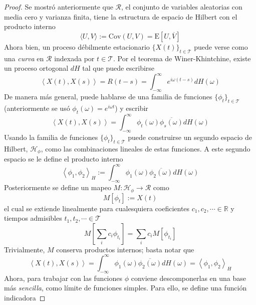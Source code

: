 \documentclass[12pt,letterpaper,draft]{book}
\newcommand{\R}{\mathbb{R}}
\newcommand{\intR}{\int_{-\infty}^{\infty}}
\newcommand{\E}[1]{\mathrm{E}\left[ #1 \right]}
\newcommand{\Cov}[1]{\mathrm{Cov}\left( #1 \right)}
\newcommand{\xt}{$\{X(t)\}_{t\in \mathcal{T}}$ }
\newcommand{\pint}[1]{\left\langle #1 \right\rangle}
\begin{document}
\begin{proof}
Se mostró anteriormente que $\mathcal{R}$, el conjunto de variables aleatorias con media cero y varianza finita, tiene la estructura de espacio de Hilbert con el producto interno
\begin{equation}
\langle U , V \rangle := \Cov{U,V} = \E{U, \overline{V}}
\end{equation}
Ahora bien, un proceso débilmente estacionario \xt puede verse como una \textit{curva} en $\mathcal{R}$ indexada por $t \in \mathcal{T}$.
%
Por el teorema de Winer-Khintchine, existe un proceso ortogonal $dH$ tal que puede escribirse
\begin{equation}
\pint{X(t),X(s)} = R(t-s) = \intR e^{i \omega (t-s)} dH(\omega)
\end{equation} 
De manera más general, puede hablarse de una familia de funciones $\{ \phi_t \}_{t\in \mathcal{T}}$ (anteriormente se usó $\phi_t(\omega) = e^{i \omega t}$) y escribir
\begin{equation}
\pint{X(t),X(s)} = \intR \phi_t(\omega) \overline{\phi_s(\omega)} dH(\omega)
\end{equation} 
Usando la familia de funciones $\{ \phi_t \}_{t\in \mathcal{T}}$ puede construirse un segundo espacio de Hilbert, $\mathcal{H}_\phi$, como las combinaciones lineales de estas funciones.
A este segundo espacio se le define el producto interno
\begin{equation}
\pint{\phi_1,\phi_2}_H := \intR \phi_1(\omega) \overline{\phi_2(\omega)} dH(\omega)
\end{equation} 
Posteriormente se define un mapeo $M : \mathcal{H}_\phi \rightarrow \mathcal{R}$ como
\begin{equation}
M[\phi_t] := X(t)
\end{equation}
el cual se extiende linealmente para cualesquiera coeficientes $c_1, c_2, \cdots \in \R$ y tiempos admisibles $t_1, t_2, \cdots \in \mathcal{T}$
\begin{equation}
M\left[ \sum_i c_i \phi_{t_i} \right] = \sum_i c_i M\left[ \phi_{t_i} \right]
\end{equation}
Trivialmente, $M$ conserva productos internos; basta notar que
\begin{equation}
\pint{X(t),X(s)} = \intR \phi_1(\omega) \overline{\phi_2(\omega)} dH(\omega) = \pint{\phi_1,\phi_2}_H
\end{equation}
Ahora, para trabajar con las funciones $\phi$ conviene descomponerlas en una base más \textit{sencilla}, como límite de funciones simples. Para ello, se define una función indicadora

\end{proof}
\end{document}
